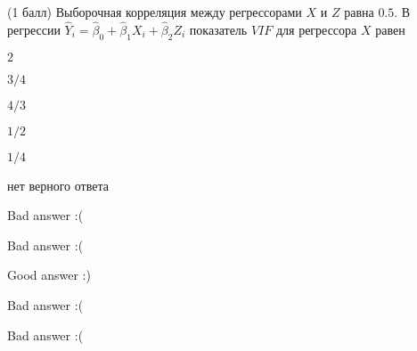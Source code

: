 
\begin{question}
(1 балл) Выборочная корреляция между регрессорами \(X\) и \(Z\) равна \(0.5\). В
регрессии \(\hat Y_i = \hat\beta_0 + \hat\beta_1 X_i + \hat\beta_2 Z_i\)
показатель \(VIF\) для регрессора \(X\) равен
\begin{answerlist}
  \item \(2\)
  \item \(3/4\)
  \item \(4/3\)
  \item \(1/2\)
  \item \(1/4\)
  \item нет верного ответа
\end{answerlist}
\end{question}

\begin{solution}
\begin{answerlist}
  \item Bad answer :(
  \item Bad answer :(
  \item Good answer :)
  \item Bad answer :(
  \item Bad answer :(
\end{answerlist}
\end{solution}
